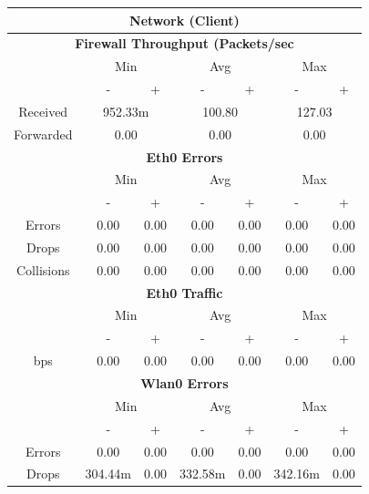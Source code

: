 \documentclass[11pt,a4paper,headinclude=false,footinclude=false]{scrreprt}
\begin{document}
\begin{table}[H]
\centering
    \begin{tabular}{||c|c|c|c|c|c|c||}
    \hline
    \multicolumn{7}{|c|}{\textbf{Network (Client)}} \\
    \hline
    \multicolumn{7}{|c|}{\textbf{Firewall Throughput (Packets/sec}} \\
    \hline\hline
      & \multicolumn{2}{|c|}{Min} & \multicolumn{2}{|c|}{Avg} & \multicolumn{2}{|c|}{Max} \\
    \hline\hline
      & - & + & - & + & - & + \\
    \hline
    Received & \multicolumn{2}{|c|}{952.33m} & \multicolumn{2}{|c|}{100.80} & \multicolumn{2}{|c|}{127.03} \\
    \hline
    Forwarded & \multicolumn{2}{|c|}{0.00} & \multicolumn{2}{|c|}{0.00} & \multicolumn{2}{|c|}{0.00} \\
    \hline\hline
    \multicolumn{7}{|c|}{\textbf{Eth0 Errors}} \\
    \hline\hline
      & \multicolumn{2}{|c|}{Min} & \multicolumn{2}{|c|}{Avg} & \multicolumn{2}{|c|}{Max} \\
    \hline
     & - & + & - & + & - & + \\
    \hline
    Errors & 0.00 & 0.00 & 0.00 & 0.00 & 0.00 & 0.00 \\
    \hline
    Drops & 0.00 & 0.00 & 0.00 & 0.00 & 0.00 & 0.00 \\
    \hline
    Collisions & 0.00 & 0.00 & 0.00 & 0.00 & 0.00 & 0.00 \\
    \hline\hline
    \multicolumn{7}{|c|}{\textbf{Eth0 Traffic}} \\
    \hline\hline
      & \multicolumn{2}{|c|}{Min} & \multicolumn{2}{|c|}{Avg} & \multicolumn{2}{|c|}{Max} \\
    \hline
      & - & + & - & + & - & + \\
    \hline
    bps & 0.00 & 0.00 & 0.00 & 0.00 & 0.00 & 0.00 \\
    \hline\hline
    \multicolumn{7}{|c|}{\textbf{Wlan0 Errors}} \\
    \hline\hline
      & \multicolumn{2}{|c|}{Min} & \multicolumn{2}{|c|}{Avg} & \multicolumn{2}{|c|}{Max} \\
    \hline
      & - & + & - & + & - & + \\
    \hline
    Errors  & 0.00 & 0.00 & 0.00 & 0.00 & 0.00 & 0.00 \\
    \hline
    Drops & 304.44m & 0.00 & 332.58m & 0.00 & 342.16m & 0.00 \\

\end{tabular}
\end{table}
\end{document}
